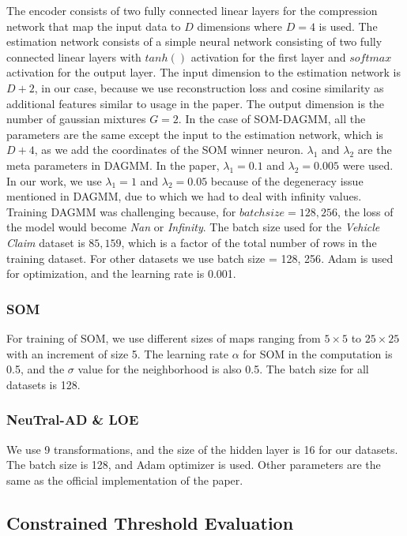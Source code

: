 \documentclass{article}
\begin{document}
The encoder consists of two fully connected linear layers for the compression network that map the input data to $D$ dimensions where $D = 4$ is used. The estimation network consists of a simple neural network consisting of two fully connected linear layers with $tanh()$ activation for the first layer and $softmax$ activation for the output layer. The input dimension to the estimation network is $D+2$, in our case, because we use reconstruction loss and cosine similarity as additional features similar to usage in the paper. The output dimension is the number of gaussian mixtures $G = 2$. In the case of SOM-DAGMM, all the parameters are the same except the input to the estimation network, which is $D+4$, as we add the coordinates of the SOM winner neuron.
$\lambda_{1}$ and $\lambda_{2}$ are the meta parameters in DAGMM. In the paper, $\lambda_{1}=0.1$ and $\lambda_{2}=0.005$ were used. In our work, we use  $\lambda_{1}=1$ and $\lambda_{2}=0.05$  because of the degeneracy issue mentioned in DAGMM, due to which we had to deal with infinity values. Training DAGMM was challenging because, for  $batch size = {128, 256}$, the loss of the model would become \textit{Nan} or \textit{Infinity}. The batch size used for the \textit{Vehicle Claim} dataset is ${85, 159}$, which is a factor of the total number of rows in the training dataset. For other datasets we use batch size = {128, 256}. Adam is used for optimization, and the learning rate is 0.001. 


\subsubsection{SOM}

For training of SOM, we use different sizes of maps ranging from ${5 \times 5}$ to ${25 \times 25}$ with an increment of size 5. The learning rate $\alpha$ for SOM in the computation is 0.5, and the $\sigma$ value for the neighborhood is also 0.5.  The batch size for all datasets is 128.

\subsubsection{NeuTral-AD \& LOE}

We use 9 transformations, and the size of the hidden layer is 16 for our datasets. The batch size is 128, and Adam optimizer is used. Other parameters are the same as the official implementation of the paper.

\subsection{Constrained Threshold Evaluation}\label{a6}
\end{document}

